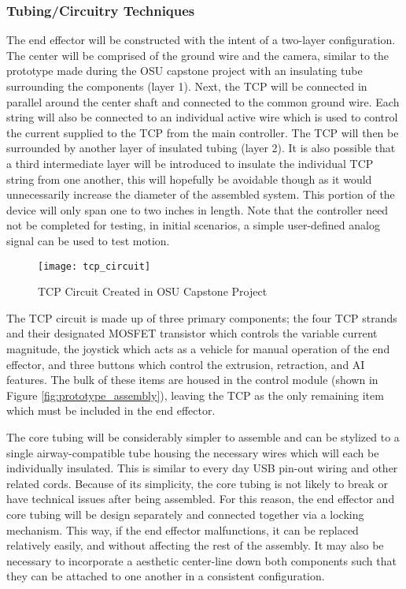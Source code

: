 	\subsubsection{Tubing/Circuitry Techniques}

		The end effector will be constructed with the intent of a two-layer configuration. The center will be comprised of the ground wire and the camera, similar to the prototype made during the OSU capstone project with an insulating tube surrounding the components (layer 1). Next, the TCP will be connected in parallel around the center shaft and connected to the common ground wire. Each string will also be connected to an individual active wire which is used to control the current supplied to the TCP from the main controller. The TCP will then be surrounded by another layer of insulated tubing (layer 2). It is also possible that a third intermediate layer will be introduced to insulate the individual TCP string from one another, this will hopefully be avoidable though as it would unnecessarily increase the diameter of the assembled system. This portion of the device will only span one to two inches in length. Note that the controller need not be completed for testing, in initial scenarios, a simple user-defined analog signal can be used to test motion.
		
		\begin{figure}[ht]
			\centering
			\texttt{[image: tcp\_circuit]}
			\caption{TCP Circuit Created in OSU Capstone Project}
			\label{fig:tcp_circuit}
		\end{figure}
		
		The TCP circuit is made up of three primary components; the four TCP strands and their designated MOSFET transistor which controls the variable current magnitude, the joystick which acts as a vehicle for manual operation of the end effector, and three buttons which control the extrusion, retraction, and AI features. The bulk of these items are housed in the control module (shown in Figure \ref{fig:prototype_assembly}), leaving the TCP as the only remaining item which must be included in the end effector.

		The core tubing will be considerably simpler to assemble and can be stylized to a single airway-compatible tube housing the necessary wires which will each be individually insulated. This is similar to every day USB pin-out wiring and other related cords. Because of its simplicity, the core tubing is not likely to break or have technical issues after being assembled. For this reason, the end effector and core tubing will be design separately and connected together via a locking mechanism. This way, if the end effector malfunctions, it can be replaced relatively easily, and without affecting the rest of the assembly. It may also be necessary to incorporate a aesthetic center-line down both components such that they can be attached to one another in a consistent configuration.
	
